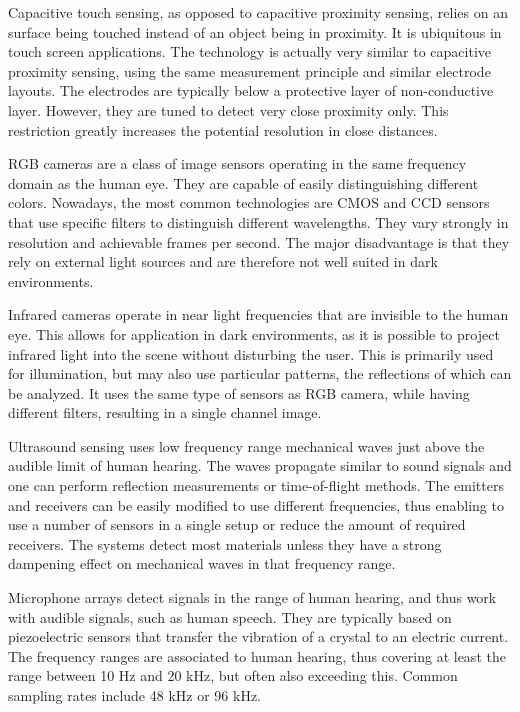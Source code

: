 Capacitive touch sensing, as opposed to capacitive proximity sensing, relies on an surface being touched instead of an object being in proximity. It is ubiquitous in touch screen applications. The technology is actually very similar to capacitive proximity sensing, using the same measurement principle and similar electrode layouts. The electrodes are typically below a protective layer of non-conductive layer. However, they are tuned to detect very close proximity only. This restriction greatly increases the potential resolution in close distances.

RGB cameras are a class of image sensors operating in the same frequency domain as the human eye. They are capable of easily distinguishing different colors. Nowadays, the most common technologies are CMOS and CCD sensors that use specific filters to distinguish different wavelengths. They vary strongly in resolution and achievable frames per second. The major disadvantage is that they rely on external light sources and are therefore not well suited in dark environments.

Infrared cameras operate in near light frequencies that are invisible to the human eye. This allows for application in dark environments, as it is possible to project infrared light into the scene without disturbing the user. This is primarily used for illumination, but may also use particular patterns, the reflections of which can be analyzed. It uses the same type of sensors as RGB camera, while having different filters, resulting in a single channel image.

Ultrasound sensing uses low frequency range mechanical waves just above the audible limit of human hearing. The waves propagate similar to sound signals and one can perform reflection measurements or time-of-flight methods. The emitters and receivers can be easily modified to use different frequencies, thus enabling to use a number of sensors in a single setup or reduce the amount of required receivers. The systems detect most materials unless they have a strong dampening effect on mechanical waves in that frequency range.

Microphone arrays detect signals in the range of human hearing, and thus work with audible signals, such as human speech. They are typically based on piezoelectric sensors that transfer the vibration of a crystal to an electric current. The frequency ranges are associated to human hearing, thus covering at least the range between 10 Hz and 20 kHz, but often also exceeding this. Common sampling rates include 48 kHz or 96 kHz. 

